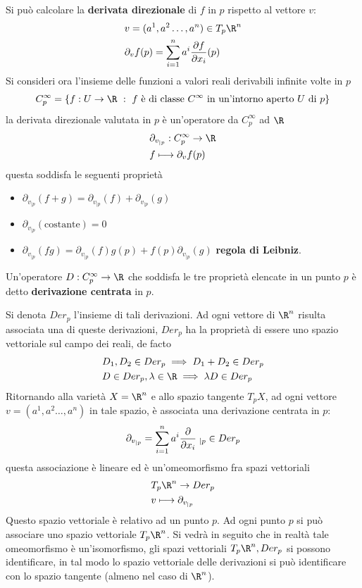 \documentclass[10pt, letterpaper]{report}
\begin{document}
Si può calcolare la \textbf{derivata direzionale} di $f$ in $p$ rispetto al vettore $v$:\begin{align}
    &v=(a^1,a^2\dots,a^n)\in T_p\R^n\\
    &\partial_vf(p)=\sum_{i=1}^n a^i\frac{\partial f}{\partial x_i}(p)
\end{align}
Si consideri ora l'insieme delle funzioni a valori reali derivabili infinite volte in $p$\begin{equation}
    C_p^\infty=\{f:U\rightarrow\R \ : \ f\text{ è di classe }C^\infty \text{ in un'intorno aperto }U\text{ di }p\}
\end{equation}
la derivata direzionale valutata in $p$ è un'operatore da $ C_p^\infty$ ad $\R$\begin{align}
    &\partial_{v_{|p}}: C_p^\infty\rightarrow\R\\ 
    &f\longmapsto \partial_vf(p)
\end{align}
questa soddisfa le seguenti proprietà\begin{itemize}
    \item $\partial_{v_{|p}}(f+g)=\partial_{v_{|p}}(f)+\partial_{v_{|p}}(g)$
    \item $\partial_{v_{|p}}(\text{costante})=0$
    \item $\partial_{v_{|p}}(fg)=\partial_{v_{|p}}(f)g(p)+f(p)\partial_{v_{|p}}(g)$ \textbf{regola di Leibniz}.
\end{itemize}
\begin{definizione}
    Un'operatore $D: C_p^\infty\rightarrow\R$ che soddisfa le tre proprietà elencate in un punto $p$ è detto \textbf{derivazione centrata} in $p$.
\end{definizione}
Si denota $Der_p$ l'insieme di tali derivazioni. Ad ogni vettore di $\R^n$ risulta associata una di queste derivazioni, $Der_p$ ha la proprietà di essere uno spazio vettoriale sul campo dei reali, de facto \begin{align}
    &D_1,D_2\in Der_p\implies D_1+D_2\in Der_p\\ 
    & D\in Der_p,\lambda\in\R\implies \lambda D\in Der_p
\end{align}
Ritornando alla varietà $X=\R^n$ e allo spazio tangente $T_pX$, ad ogni vettore $v=(a^1,a^2\dots,a^n)$ in tale spazio, è associata una derivazione centrata in $p$:\begin{equation}
    \partial_{v_{|p}}={\sum_{i=1}^n a^i\frac{\partial }{\partial x_i}}\hphantom{.}_{|p}\in Der_p
\end{equation}
questa associazione è lineare ed è un'omeomorfismo fra spazi vettoriali\begin{align}
    &T_p\R^n\rightarrow Der_p\\ 
    & v\longmapsto  \partial_{v_{|p}}
\end{align}
Questo spazio vettoriale è relativo ad un punto $p$. Ad ogni punto $p$ si può associare uno spazio vettoriale  $T_p\R^n$. Si vedrà in seguito che in realtà tale omeomorfismo è un'isomorfismo, gli spazi vettoriali $T_p\R^n, Der_p$ si possono identificare, in tal modo lo spazio vettoriale delle derivazioni si può identificare con lo spazio tangente (almeno nel caso di $\R^n$).\bigskip
\end{document}
